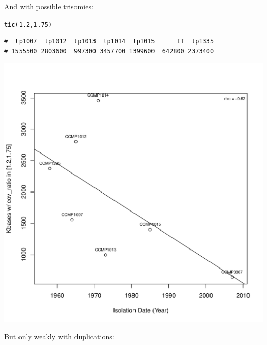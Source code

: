 \documentclass{article}\usepackage[]{graphicx}\usepackage[]{color}
\makeatletter
\def\maxwidth{ %
  \ifdim\Gin@nat@width>\linewidth
    \linewidth
  \else
    \Gin@nat@width
  \fi
}
\newcommand{\hlnum}[1]{\textcolor[rgb]{0.686,0.059,0.569}{#1}}%
\newcommand{\hlstd}[1]{\textcolor[rgb]{0.345,0.345,0.345}{#1}}%
\newcommand{\hlkwd}[1]{\textcolor[rgb]{0.737,0.353,0.396}{\textbf{#1}}}%
\newenvironment{kframe}{%
 \def\at@end@of@kframe{}%
 \ifinner\ifhmode%
  \def\at@end@of@kframe{\end{minipage}}%
  \begin{minipage}{\columnwidth}%
 \fi\fi%
 \def\FrameCommand##1{\hskip\@totalleftmargin \hskip-\fboxsep
 \colorbox{shadecolor}{##1}\hskip-\fboxsep
     \hskip-\linewidth \hskip-\@totalleftmargin \hskip\columnwidth}%
 \MakeFramed {\advance\hsize-\width
   \@totalleftmargin\z@ \linewidth\hsize
   \@setminipage}}%
 {\par\unskip\endMakeFramed%
 \at@end@of@kframe}
\newenvironment{knitrout}{}{} %
\makeatother
\begin{document}
And with possible trisomies:

\begin{knitrout}\footnotesize
{}\color{fgcolor}\begin{kframe}
\begin{alltt}
\hlkwd{tic}\hlstd{(}\hlnum{1.2}\hlstd{,}\hlnum{1.75}\hlstd{)}
\end{alltt}
\begin{verbatim}
#  tp1007  tp1012  tp1013  tp1014  tp1015      IT  tp1335 
# 1555500 2803600  997300 3457700 1399600  642800 2373400
\end{verbatim}
\end{kframe}

{\centering \includegraphics[width=\maxwidth]{figs-knitr/trisomy-1} 

}



\end{knitrout}

But only weakly with duplications:
\end{document}
